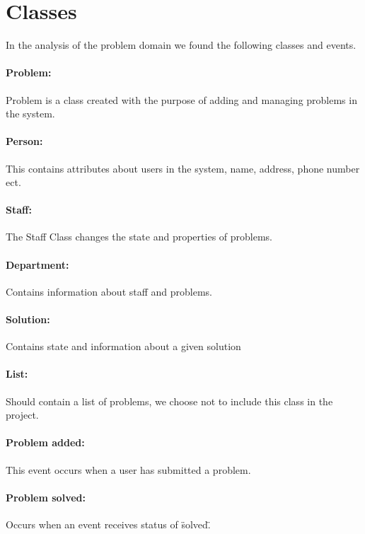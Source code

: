 \section{Classes}
\label{cap:classesevents}
In the analysis of the problem domain we found the following classes and events.

\paragraph{Problem:}
Problem is a class created with the purpose of adding and managing problems in the system.

\paragraph{Person:}
This contains attributes about users in the system, name, address, phone number ect.

\paragraph{Staff:}
The Staff Class changes the state and properties of problems. 

\paragraph{Department:}
Contains information about staff and problems.

\paragraph{Solution:}
Contains state and information about a given solution

\paragraph{List:}
Should contain a list of problems, we choose not to include this class in the project.

\paragraph{Problem added:}
This event occurs when a user has submitted a problem.

\paragraph{Problem solved:}
Occurs when an event receives status of \"solved\".

